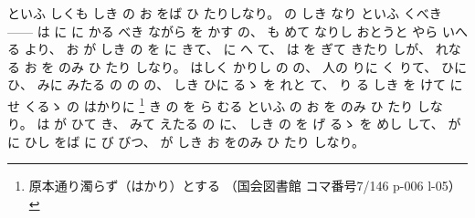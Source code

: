 といふ
しくも
しき
の
お
をば
ひ
たりしなり。
%
の
しき
なり
といふ
くべき
%
{---}{---}%
は
に
に
かる
べき
ながら
を
かす
の、
%
も
めて
なりし
おとうと
やら
いへる
より、
%
お
が
しき
の
を
%
に
きて、
%
に
へ
て、
%
は
を
ぎて
きたり
しが、
%
れなる
お
を
のみ
ひ
たり
しなり。
%
はしく
かりし
の
の、
%
人の
りに
く
りて、
%
ひに
ひ、
%
みに
みたる
の
の
の、
%
しき
ひに
るゝ
を
れと
て、
%
り
%
る
しき
を
けて
に
せ
くるゝ
の
はかりに%
\footnote{原本通り濁らず（はかり）とする%
（国会図書館 コマ番号7/146 p-006 l-05）}%
き%
の
を
ら
むる
といふ
の
お
を
のみ
ひ
たり
しなり。
%
は
が
ひて
き、
%
みて
えたる
の
に、
%
しき
の
を
げ
るゝ
を
めし
して、
%
が
に
ひし
をば
%
に
び
びつ、
%
が
しき
お
をのみ
ひ
たり
しなり。
